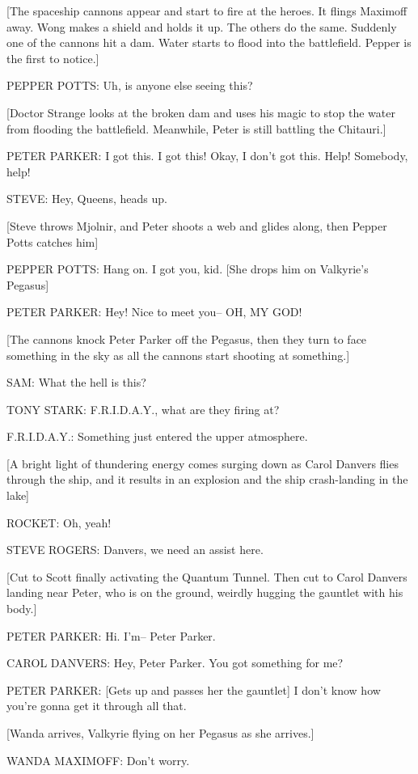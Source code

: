 [The spaceship cannons appear and start to fire at the heroes. It flings Maximoff away. Wong makes a shield and holds it up. The others do the same. Suddenly one of the cannons hit a dam. Water starts to flood into the battlefield. Pepper is the first to notice.]

PEPPER POTTS: Uh, is anyone else seeing this?

[Doctor Strange looks at the broken dam and uses his magic to stop the water from flooding the battlefield. Meanwhile, Peter is still battling the Chitauri.]

PETER PARKER: I got this. I got this! Okay, I don't got this. Help! Somebody, help!

STEVE: Hey, Queens, heads up.

[Steve throws Mjolnir, and Peter shoots a web and glides along, then Pepper Potts catches him]

PEPPER POTTS: Hang on. I got you, kid. [She drops him on Valkyrie's Pegasus]

PETER PARKER: Hey! Nice to meet you– OH, MY GOD!

[The cannons knock Peter Parker off the Pegasus, then they turn to face something in the sky as all the cannons start shooting at something.]

SAM: What the hell is this?

TONY STARK: F.R.I.D.A.Y., what are they firing at?

F.R.I.D.A.Y.: Something just entered the upper atmosphere.

[A bright light of thundering energy comes surging down as Carol Danvers flies through the ship, and it results in an explosion and the ship crash-landing in the lake]

ROCKET: Oh, yeah!

STEVE ROGERS: Danvers, we need an assist here.

[Cut to Scott finally activating the Quantum Tunnel. Then cut to Carol Danvers landing near Peter, who is on the ground, weirdly hugging the gauntlet with his body.]

PETER PARKER: Hi. I'm– Peter Parker.

CAROL DANVERS: Hey, Peter Parker. You got something for me?

PETER PARKER: [Gets up and passes her the gauntlet] I don't know how you're gonna get it through all that.

[Wanda arrives, Valkyrie flying on her Pegasus as she arrives.]

WANDA MAXIMOFF: Don't worry.

